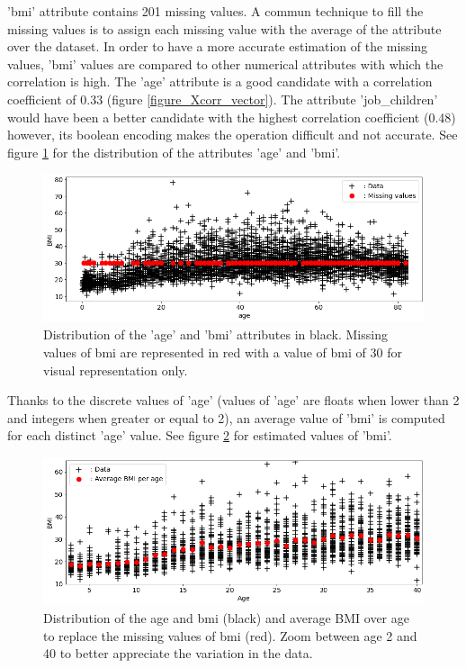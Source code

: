 'bmi' attribute contains 201 missing values. A commun technique to fill the missing values is to 
assign each missing value with the average of the attribute over the dataset. In order to have a more 
accurate estimation of the missing values, 'bmi' values are compared to other numerical attributes 
with which the correlation is high. The 'age' attribute is a good candidate with a correlation 
coefficient of 0.33 (figure \ref{figure_Xcorr_vector}). The attribute 'job\_children' would have 
been a better candidate with the highest correlation coefficient (0.48) however, its boolean encoding 
makes the operation difficult and not accurate. See figure \ref{figure_age_bmi} for the distribution 
of the attributes 'age' and 'bmi'.   

\begin{figure}[H]
\centering
\includegraphics[scale=0.5]{../figures/plot_age_bmi_missing.png}
\caption{Distribution of the 'age' and 'bmi' attributes in black. Missing values of bmi are represented in red with a value of bmi of 30 for visual representation only.}
\label{figure_age_bmi}
\end{figure}

Thanks to the discrete values of 'age' (values of 'age' are floats when lower than 2 and integers 
when greater or equal to 2), an average value of 'bmi' is computed for each distinct 'age' value. 
See figure \ref{figure_age_bmi_replaced} for estimated values of 'bmi'. 

\begin{figure}[H]
\centering
\includegraphics[scale=0.5]{../figures/plot_age_bmi_replaced.png}
\caption{Distribution of the age and bmi (black) and average BMI over age to replace the missing values of bmi (red). Zoom between age 2 and 40 to better appreciate the variation in the data.}
\label{figure_age_bmi_replaced}
\end{figure}

